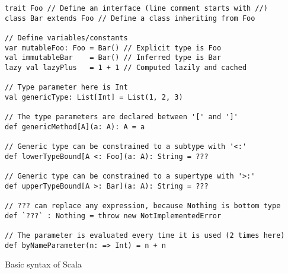 \begin{algorithm}

\begin{verbatim}
trait Foo // Define an interface (line comment starts with //)
class Bar extends Foo // Define a class inheriting from Foo

// Define variables/constants
var mutableFoo: Foo = Bar() // Explicit type is Foo
val immutableBar    = Bar() // Inferred type is Bar
lazy val lazyPlus   = 1 + 1 // Computed lazily and cached

// Type parameter here is Int
val genericType: List[Int] = List(1, 2, 3)

// The type parameters are declared between '[' and ']'
def genericMethod[A](a: A): A = a

// Generic type can be constrained to a subtype with '<:'
def lowerTypeBound[A <: Foo](a: A): String = ???

// Generic type can be constrained to a supertype with '>:'
def upperTypeBound[A >: Bar](a: A): String = ???

// ??? can replace any expression, because Nothing is bottom type
def `???` : Nothing = throw new NotImplementedError

// The parameter is evaluated every time it is used (2 times here)
def byNameParameter(n: => Int) = n + n
\end{verbatim}

\caption{Basic syntax of Scala \label{scala:basics}}
\end{algorithm}